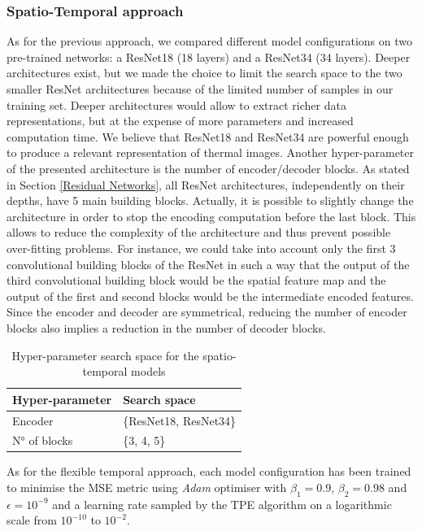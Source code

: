 \subsubsection{Spatio-Temporal approach}
As for the previous approach, we compared different model configurations on two pre-trained networks: a ResNet18 (18 layers) and a ResNet34 (34 layers). Deeper architectures exist, but we made the choice to limit the search space to the two smaller ResNet architectures because of the limited number of samples in our training set. Deeper architectures would allow to extract richer data representations, but at the expense of more parameters and increased computation time. We believe that ResNet18 and ResNet34 are powerful enough to produce a relevant representation of thermal images. Another hyper-parameter of the presented architecture is the number of encoder/decoder blocks. As stated in Section \ref{Residual Networks}, all ResNet architectures, independently on their depths, have 5 main building blocks. Actually, it is possible to slightly change the architecture in order to stop the encoding computation before the last block. This allows to reduce the complexity of the architecture and thus prevent possible over-fitting problems. For instance, we could take into account only the first 3 convolutional building blocks of the ResNet in such a way that the output of the third convolutional building block would be the spatial feature map and the output of the first and second blocks would be the intermediate encoded features. Since the encoder and decoder are symmetrical, reducing the number of encoder blocks also implies a reduction in the number of decoder blocks.

\begin{table}[h!]
    \centering
    \caption{Hyper-parameter search space for the spatio-temporal models}
    \begin{tabular}{ll}
    \toprule
    \textbf{Hyper-parameter} & \textbf{Search space} \\ 
    \midrule
    Encoder & \{ResNet18, ResNet34\} \\
    N° of blocks  & \{3, 4, 5\} \\
    \bottomrule
    \end{tabular}
    \label{tab:spatial_temporal_search_space}
\end{table}

As for the flexible temporal approach, each model configuration has been trained to minimise the MSE metric using \textit{Adam} optimiser with $\beta_{1} = 0.9$, $\beta_{2} = 0.98$ and $\epsilon = 10^{-9}$ and a learning rate sampled by the TPE algorithm on a logarithmic scale from $10^{-10}$ to $10^{-2}$. 

